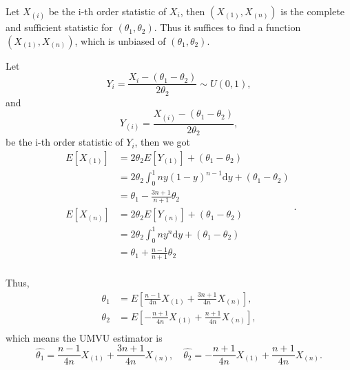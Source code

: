 \begin{solution}
    Let $X_{(i)}$ be the i-th order statistic of $X_i$, then $\left(X_{(1)},X_{(n)}\right)$ is the complete and sufficient statistic for $(\theta_1,\theta_2)$. Thus it suffices to find a function $\left(X_{(1)},X_{(n)}\right)$, which is unbiased of $(\theta_1,\theta_2)$.

    Let
    \begin{equation*}
        Y_i=\frac{X_i-(\theta_1-\theta_2)}{2\theta_2}\sim U(0,1),
    \end{equation*}
    and
    \begin{equation*}
        Y_{(i)}=\frac{X_{(i)}-(\theta_1-\theta_2)}{2\theta_2},
    \end{equation*}
    be the i-th order statistic of $Y_i$, then we got
    \begin{equation*}
        \begin{aligned}
            E[X_{(1)}] & = 2\theta_2E[Y_{(1)}]+(\theta_1-\theta_2)                           \\
                       & = 2\theta_2\int_{0}^{1}ny(1-y)^{n-1}\mathrm{d}y+(\theta_1-\theta_2) \\
                       & = \theta_1-\frac{3n+1}{n+1}\theta_2                                 \\
            E[X_{(n)}] & = 2\theta_2E[Y_{(n)}]+(\theta_1-\theta_2)                           \\
                       & = 2\theta_2\int_{0}^{1}ny^{n}\mathrm{d}y+(\theta_1-\theta_2)        \\
                       & = \theta_1+\frac{n-1}{n+1}\theta_2                                  \\
        \end{aligned}.
    \end{equation*}

    Thus,
    \begin{equation*}
        \begin{aligned}
            \theta_1 & = E\left[\frac{n-1}{4n}X_{(1)}+\frac{3n+1}{4n}X_{(n)}\right], \\
            \theta_2 & = E\left[-\frac{n+1}{4n}X_{(1)}+\frac{n+1}{4n}X_{(n)}\right], \\
        \end{aligned}
    \end{equation*}
    which means the UMVU estimator is
    \begin{equation*}
        \hat{\theta_1}=\frac{n-1}{4n}X_{(1)}+\frac{3n+1}{4n}X_{(n)},\quad\hat{\theta_2}=-\frac{n+1}{4n}X_{(1)}+\frac{n+1}{4n}X_{(n)}.
    \end{equation*}
\end{solution}
